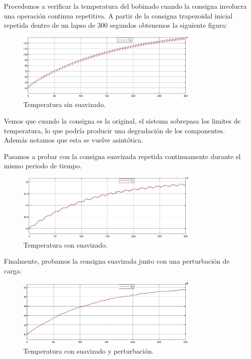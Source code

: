 \documentclass{article}
\begin{document}
Procedemos a verificar la temperatura del bobinado cuando la consigna involucra una operación 
continua repetitiva. A partir de la consigna 
trapezoidal inicial repetida dentro de un lapso de $300$ segundos obtenemos la siguiente figura:

\begin{figure}[H]
    \centering
    \includegraphics[width=0.8\textwidth]{5.2.5.1.c.1.png}
    \caption{Temperatura sin suavizado.}
\end{figure}

Vemos que cuando la consigna es la original, el sistema sobrepasa los limites de temperatura, lo 
que podría producir una degradación de los componentes. Además notamos que esta se vuelve asintótica.

Pasamos a probar con la consigna suavizada repetida continuamente durante el mismo periodo de tiempo.
    
\begin{figure}[H]
    \centering
    \includegraphics[width=0.8\textwidth]{5.2.5.1.c.2.png}
    \caption{Temperatura con suavizado.}
\end{figure}

Finalmente, probamos la consigna suavizada junto con una perturbación de carga:

\begin{figure}[H]
    \centering
    \includegraphics[width=0.8\textwidth]{5.2.5.1.c.3.png}
    \caption{Temperatura con suavizado y perturbación.}
\end{figure}
    
\end{document}
